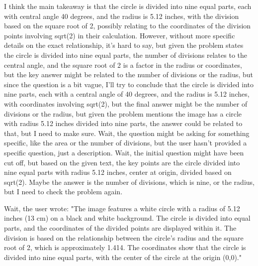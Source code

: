I think the main takeaway is that the circle is divided into nine equal parts, each with central angle 40 degrees, and the radius is 5.12 inches, with the division based on the square root of 2, possibly relating to the coordinates of the division points involving sqrt(2) in their calculation. However, without more specific details on the exact relationship, it's hard to say, but given the problem states the circle is divided into nine equal parts, the number of divisions relates to the central angle, and the square root of 2 is a factor in the radius or coordinates, but the key answer might be related to the number of divisions or the radius, but since the question is a bit vague, I'll try to conclude that the circle is divided into nine parts, each with a central angle of 40 degrees, and the radius is 5.12 inches, with coordinates involving sqrt(2), but the final answer might be the number of divisions or the radius, but given the problem mentions the image has a circle with radius 5.12 inches divided into nine parts, the answer could be related to that, but I need to make sure. Wait, the question might be asking for something specific, like the area or the number of divisions, but the user hasn't provided a specific question, just a description. Wait, the initial question might have been cut off, but based on the given text, the key points are the circle divided into nine equal parts with radius 5.12 inches, center at origin, divided based on sqrt(2). Maybe the answer is the number of divisions, which is nine, or the radius, but I need to check the problem again. 

Wait, the user wrote: "The image features a white circle with a radius of 5.12 inches (13 cm) on a black and white background. The circle is divided into equal parts, and the coordinates of the divided points are displayed within it. The division is based on the relationship between the circle's radius and the square root of 2, which is approximately 1.414. The coordinates show that the circle is divided into nine equal parts, with the center of the circle at the origin (0,0)." 

